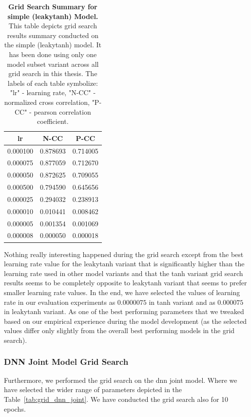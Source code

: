 \begin{table}
    \centering\footnotesize\sf
    \begin{tabular}{ccc}
    \toprule
    lr & N-CC & P-CC \\
    \midrule
    0.000100 & 0.878693 & 0.714005 \\
    0.000075 & 0.877059 & 0.712670 \\
    0.000050 & 0.872625 & 0.709055 \\
    0.000500 & 0.794590 & 0.645656 \\
    0.000025 & 0.294032 & 0.238913 \\
    0.000010 & 0.010441 & 0.008462 \\
    0.000005 & 0.001354 & 0.001069 \\
    0.000008 & 0.000050 & 0.000018 \\
    \bottomrule
    \end{tabular}
    \caption{\textbf{Grid Search Summary for simple (leakytanh) Model.} This table depicts grid search results summary conducted on the simple (leakytanh) model. It has been done using only one model subset variant across all grid search in this thesis. The labels of each table symbolize: "lr" - learning rate, "N-CC" - normalized cross correlation, "P-CC" - pearson correlation coefficient.}
    \label{tab:grid_simple_leakytanh}
\end{table}

Nothing really interesting happened during the grid search except from the best learning rate value for the leakytanh variant that is significantly higher than the learning rate used in other model variants and that the tanh variant grid search results seems to be completely opposite to leakytanh variant that seems to prefer smaller learning rate values. In the end, we have selected the values of learning rate in our evaluation experiments as $0.0000075$ in tanh variant and as $0.000075$ in leakytanh variant. As one of the best performing parameters that we tweaked based on our empirical experience during the model development (as the selected values differ only slightly from the overall best performing models in the grid search).

\subsubsection{DNN Joint Model Grid Search}
\label{subsubsec:dnn_joint_grid_search}
Furthermore, we performed the grid search on the dnn joint model. Where we have selected the wider range of parameters depicted in the Table~\ref{tab:grid_dnn_joint}. We have conducted the grid search also for 10 epochs.

